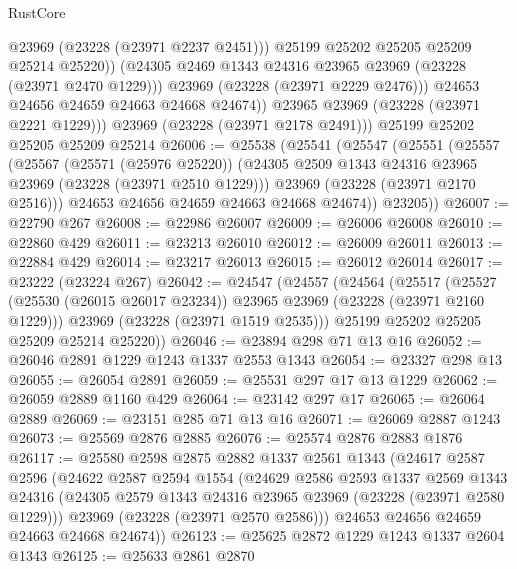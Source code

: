 \begin{lexlean}{RustCore}
\begin{coremodule}
                    @23969
                    (@23228 (@23971 @2237 @2451)))
                  @25199
                  @25202
                  @25205
                  @25209
                  @25214
                  @25220))
              (@24305 @2469 @1343 @24316 @23965 @23969 (@23228 (@23971 @2470 @1229)))
              @23969
              (@23228 (@23971 @2229 @2476)))
            @24653
            @24656
            @24659
            @24663
            @24668
            @24674))
        @23965
        @23969
        (@23228 (@23971 @2221 @1229)))
      @23969
      (@23228 (@23971 @2178 @2491)))
    @25199
    @25202
    @25205
    @25209
    @25214
@26006 := @25538
    (@25541
      (@25547
        (@25551
          (@25557
            (@25567
              (@25571 (@25976 @25220))
              (@24305 @2509 @1343 @24316 @23965 @23969 (@23228 (@23971 @2510 @1229)))
              @23969
              (@23228 (@23971 @2170 @2516)))
            @24653
            @24656
            @24659
            @24663
            @24668
            @24674))
        @23205))
@26007 := @22790 @267
@26008 := @22986 @26007
@26009 := @26006 @26008
@26010 := @22860 @429
@26011 := @23213 @26010
@26012 := @26009 @26011
@26013 := @22884 @429
@26014 := @23217 @26013
@26015 := @26012 @26014
@26017 := @23222 (@23224 @267)
@26042 := @24547
    (@24557
      (@24564
        (@25517
          (@25527 (@25530 (@26015 @26017 @23234)) @23965 @23969 (@23228 (@23971 @2160 @1229)))
          @23969
          (@23228 (@23971 @1519 @2535)))
        @25199
        @25202
        @25205
        @25209
        @25214
        @25220))
@26046 := @23894 @298 @71 @13 @16
@26052 := @26046 @2891 @1229 @1243 @1337 @2553 @1343
@26054 := @23327 @298 @13
@26055 := @26054 @2891
@26059 := @25531 @297 @17 @13 @1229
@26062 := @26059 @2889 @1160 @429
@26064 := @23142 @297 @17
@26065 := @26064 @2889
@26069 := @23151 @285 @71 @13 @16
@26071 := @26069 @2887 @1243
@26073 := @25569 @2876 @2885
@26076 := @25574 @2876 @2883 @1876
@26117 := @25580
    @2598
    @2875
    @2882
    @1337
    @2561
    @1343
    (@24617
      @2587
      @2596
      (@24622
        @2587
        @2594
        @1554
        (@24629
          @2586
          @2593
          @1337
          @2569
          @1343
          @24316
          (@24305 @2579 @1343 @24316 @23965 @23969 (@23228 (@23971 @2580 @1229)))
          @23969
          (@23228 (@23971 @2570 @2586)))
        @24653
        @24656
        @24659
        @24663
        @24668
        @24674))
@26123 := @25625 @2872 @1229 @1243 @1337 @2604 @1343
@26125 := @25633 @2861 @2870

\end{coremodule}
\end{lexlean}
